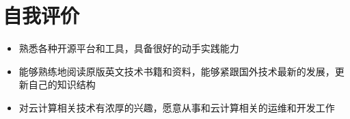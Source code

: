 \documentclass{resume}
\begin{document}



\section{自我评价}
\begin{itemize}
  \item 熟悉各种开源平台和工具，具备很好的动手实践能力
  \item 能够熟练地阅读原版英文技术书籍和资料，能够紧跟国外技术最新的发展，更新自己的知识结构
  \item 对云计算相关技术有浓厚的兴趣，愿意从事和云计算相关的运维和开发工作
\end{itemize}
\end{document}
